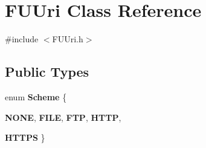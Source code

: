 \hypertarget{classFUUri}{
\section{FUUri Class Reference}
\label{classFUUri}
}


{\ttfamily \#include $<$FUUri.h$>$}

\subsection*{Public Types}
\begin{DoxyCompactItemize}
\item 
enum {\bfseries Scheme} \{ \par
{\bfseries NONE}, 
{\bfseries FILE}, 
{\bfseries FTP}, 
{\bfseries HTTP}, 
\par
{\bfseries HTTPS}
 \}
\end{DoxyCompactItemize}

